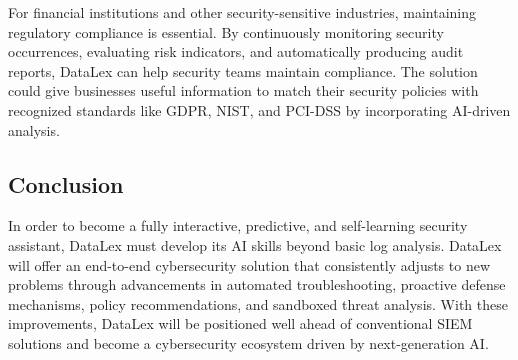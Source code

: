 For financial institutions and other security-sensitive industries, maintaining regulatory compliance is essential. By continuously monitoring security occurrences, evaluating risk indicators, and automatically producing audit reports, DataLex can help security teams maintain compliance. The solution could give businesses useful information to match their security policies with recognized standards like GDPR, NIST, and PCI-DSS by incorporating AI-driven analysis.

\subsection{Conclusion}
\label{subsec_future_direction_conclusion}

In order to become a fully interactive, predictive, and self-learning security assistant, DataLex must develop its AI skills beyond basic log analysis. DataLex will offer an end-to-end cybersecurity solution that consistently adjusts to new problems through advancements in automated troubleshooting, proactive defense mechanisms, policy recommendations, and sandboxed threat analysis. With these improvements, DataLex will be positioned well ahead of conventional SIEM solutions and become a cybersecurity ecosystem driven by next-generation AI.
